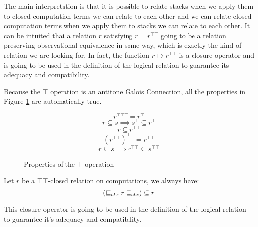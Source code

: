 The main interpretation is that it is possible to 
relate stacks 
when we apply them to closed computation terms we can relate to each other and 
we can relate closed computation terms when we apply them to stacks we can relate to
each other. 
It can be intuited that a relation $r$ satisfying $r = r^{\top\top}$ going 
to be a relation preserving observational equivalence 
in some way, which is exactly the kind of relation 
we are looking for.
In fact, the function $r \mapsto r^{\top\top}$ is a closure operator
and is going to be used in the definition 
of the logical relation to guarantee its adequacy and compatibility.


Because the $\top$ operation is an antitone Galois Connection, 
all the properties in Figure \ref{fig:galois} are automatically true.


\begin{figure}[h]
        \begin{equation*}
            r^{\top\top\top} = r^\top
        \end{equation*}
        \begin{equation*}
            r \subseteq s \implies s^\top \subseteq r^\top
        \end{equation*}
        \begin{equation*}
            r \subseteq r^{\top\top}
        \end{equation*}
        \begin{equation*}
            (r^{\top\top})^{\top\top} = r^{\top\top}
        \end{equation*}
        \begin{equation*}
            r \subseteq s \implies r^{\top\top} \subseteq s^{\top\top}
        \end{equation*}
    \caption{Properties of the $\top$ operation}
    \label{fig:galois}
\end{figure}


\begin{lemma}
    \label{lem:saturation}
    Let $r$ be a $\top\top$-closed relation on 
    computations, we always have:
    \begin{equation*}
        (\sqsubseteq_{ctx} r \sqsubseteq_{ctx}) \subseteq r 
    \end{equation*}
\end{lemma}

This closure operator is going to be used in the definition 
of the logical relation to guarantee it's adequacy and compatibility.

